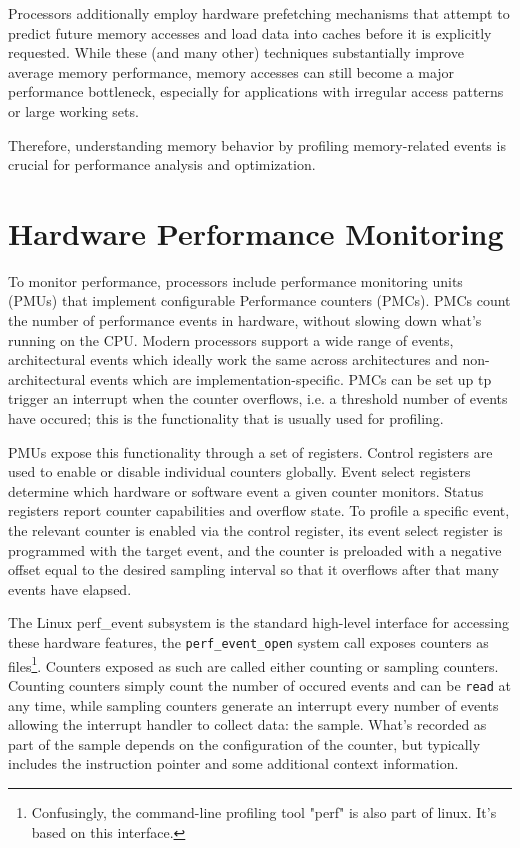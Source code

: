 Processors additionally employ hardware prefetching mechanisms that attempt to predict future memory accesses and load data into caches before it is explicitly requested\cite[2.2]{Hennessy2011}. While these (and many other) techniques substantially improve average memory performance, memory accesses can still become a major performance bottleneck, especially for applications with irregular access patterns or large working sets\cite{Zandieh2025,Fisher}.

Therefore, understanding memory behavior by profiling memory-related events is crucial for performance analysis and optimization.

\section{Hardware Performance Monitoring}
\label{sec:hardware-performance-monitoring}

To monitor performance, processors include performance monitoring units (PMUs) that implement configurable Performance counters (PMCs). PMCs count the number of performance events in hardware, without slowing down what's running on the CPU. Modern processors support a wide range of events, architectural events which ideally work the same across architectures and non-architectural events which are implementation-specific. PMCs can be set up tp trigger an interrupt when the counter overflows, i.e. a threshold number of events have occured; this is the functionality that is usually used for profiling.\cite{IntelManual,AMDManual,ARMManual}

PMUs expose this functionality through a set of registers. Control registers are used to enable or disable individual counters globally. Event select registers determine which hardware or software event a given counter monitors. Status registers report counter capabilities and overflow state. To profile a specific event, the relevant counter is enabled via the control register, its event select register is programmed with the target event, and the counter is preloaded with a negative offset equal to the desired sampling interval so that it overflows after that many events have elapsed.\cite{IntelManual,AMDManual,ARMManual}

The Linux perf\_event subsystem is the standard high-level interface for accessing these hardware features, the \texttt{perf\_event\_open} system call exposes counters as files\footnote{Confusingly, the command-line profiling tool "perf" is also part of linux. It's based on this interface.}. Counters exposed as such are called either counting or sampling counters. Counting counters simply count the number of occured events and can be \texttt{read} at any time, while sampling counters generate an interrupt every number of events allowing the interrupt handler to collect data: the sample. What's recorded as part of the sample depends on the configuration of the counter, but typically includes the instruction pointer and some additional context information.\cite{perfManpage}

